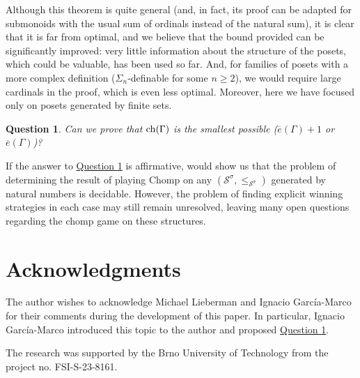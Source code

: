 \documentclass[reqno]{amsart}
\newtheorem{question}[theorem]{Question}
\theoremstyle{definition}
\theoremstyle{definition}
\theoremstyle{plain} %
\begin{document}
Although this theorem is quite general (and, in fact, its proof can be adapted for submonoids with the usual sum of ordinals instead of the natural sum), it is clear that it is far from optimal, and we believe that the bound provided can be significantly improved: very little information about the structure of the posets, which could be valuable, has been used so far. And, for families of posets with a more complex definition ($\Sigma_n$-definable for some $n \geq 2$), we would require large cardinals in the proof, which is even less optimal. Moreover, here we have focused only on posets generated by finite sets.
\begin{question}\label{ques}
Can we prove that $\textnormal{ch}(\Gamma)$ is the smallest possible ($\overline{e}(\Gamma)+1$ or $\overline{e}(\Gamma)$)?
\end{question}

If the answer to \hyperref[ques]{Question \ref{ques}} is affirmative, \cite[Theorem 6.5]{ALCO_2018__1_3_371_0} would show us that the problem of determining the result of playing Chomp on any $(\mathcal{S}^\sigma,\leq_{\mathcal{S}^\sigma})$ generated by natural numbers is decidable. However, the problem of finding explicit winning strategies in each case may still remain unresolved, leaving many open questions regarding the chomp game on these structures.

\section*{Acknowledgments}
The author wishes to acknowledge Michael Lieberman and Ignacio García-Marco for their comments during the development of this paper. In particular, Ignacio García-Marco introduced this topic to the author and proposed \hyperref[ques]{Question \ref{ques}}.

The research was supported by the Brno University of Technology from the project no. FSI-S-23-8161.
\end{document}
